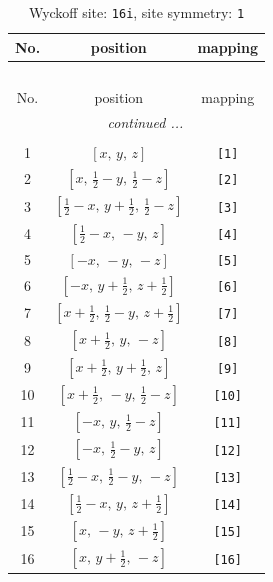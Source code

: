 \documentclass[fleqn,8pt]{jsarticle}
\begin{document}
\begin{longtable}{ccc}
\caption{Wyckoff site: {\tt 16i}, site symmetry: {\tt 1}}
 \\
 \hline \hline
No. & position & mapping \\ \hline \endfirsthead

\multicolumn{2}{l}{\tablename\ \thetable{}} \\
 \hline \hline
No. & position & mapping \\ \hline \endhead

 \hline \hline
\multicolumn{2}{r}{\footnotesize\it continued ...} \\ \endfoot

 \hline \hline
\multicolumn{2}{r}{} \\ \endlastfoot

1 & $\left[ x,\, y,\, z \right]$ & {\tt [1]} \\ \hline
2 & $\left[ x,\, \frac{1}{2} - y,\, \frac{1}{2} - z \right]$ & {\tt [2]} \\ \hline
3 & $\left[ \frac{1}{2} - x,\, y + \frac{1}{2},\, \frac{1}{2} - z \right]$ & {\tt [3]} \\ \hline
4 & $\left[ \frac{1}{2} - x,\, - y,\, z \right]$ & {\tt [4]} \\ \hline
5 & $\left[ - x,\, - y,\, - z \right]$ & {\tt [5]} \\ \hline
6 & $\left[ - x,\, y + \frac{1}{2},\, z + \frac{1}{2} \right]$ & {\tt [6]} \\ \hline
7 & $\left[ x + \frac{1}{2},\, \frac{1}{2} - y,\, z + \frac{1}{2} \right]$ & {\tt [7]} \\ \hline
8 & $\left[ x + \frac{1}{2},\, y,\, - z \right]$ & {\tt [8]} \\ \hline
9 & $\left[ x + \frac{1}{2},\, y + \frac{1}{2},\, z \right]$ & {\tt [9]} \\ \hline
10 & $\left[ x + \frac{1}{2},\, - y,\, \frac{1}{2} - z \right]$ & {\tt [10]} \\ \hline
11 & $\left[ - x,\, y,\, \frac{1}{2} - z \right]$ & {\tt [11]} \\ \hline
12 & $\left[ - x,\, \frac{1}{2} - y,\, z \right]$ & {\tt [12]} \\ \hline
13 & $\left[ \frac{1}{2} - x,\, \frac{1}{2} - y,\, - z \right]$ & {\tt [13]} \\ \hline
14 & $\left[ \frac{1}{2} - x,\, y,\, z + \frac{1}{2} \right]$ & {\tt [14]} \\ \hline
15 & $\left[ x,\, - y,\, z + \frac{1}{2} \right]$ & {\tt [15]} \\ \hline
16 & $\left[ x,\, y + \frac{1}{2},\, - z \right]$ & {\tt [16]} \\
\end{longtable}
\end{document}
